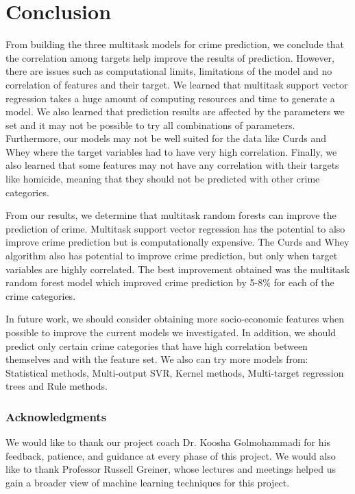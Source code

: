 \documentclass{article}
\begin{document}
\section{Conclusion}

From building the three multitask models for crime prediction, we conclude that the correlation among targets help improve the results of prediction. However, there are issues such as computational limits, limitations of the model and no correlation of features and their target. We learned that multitask support vector regression takes a huge amount of computing resources and time to generate a model. We also learned that prediction results are affected by the parameters we set and it may not be possible to try all combinations of parameters. Furthermore, our models may not be well suited for the data like Curds and Whey where the target variables had to have very high correlation. Finally, we also learned that some features may not have any correlation with their targets like homicide, meaning that they should not be predicted with other crime categories.

From our results, we determine that multitask random forests can improve the prediction of crime. Multitask support vector regression has the potential to also improve crime prediction but is computationally expensive. The Curds and Whey algorithm also has potential to improve crime prediction, but only when target variables are highly correlated. The best improvement obtained was the multitask random forest model which improved crime prediction by 5-8\% for each of the crime categories.

In future work, we should consider obtaining more socio-economic features when possible to improve the current models we investigated. In addition, we should predict only certain crime categories that have high correlation between themselves and with the feature set. We also can try more models from: Statistical methods, Multi-output SVR, Kernel methods, Multi-target regression trees and Rule methods.

\subsubsection*{Acknowledgments}

We would like to thank our project coach Dr. Koosha Golmohammadi for his feedback, patience, and guidance at every phase of this project. We would also like to thank Professor Russell Greiner, whose lectures and meetings helped us gain a broader view of machine learning techniques for this project.

\small


\end{document}
